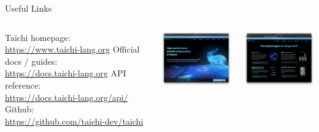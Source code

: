 \begin{frame}{Useful Links}
\begin{columns}
\centering
\begin{outline}
  \1 Taichi homepage: \\ \url{https://www.taichi-lang.org}
  \1 Official docs / guides: \\ \url{https://docs.taichi-lang.org}
  \1 API reference: \\ \url{https://docs.taichi-lang.org/api/}
  \1 Github: \\ \url{https://github.com/taichi-dev/taichi}
\end{outline}
\centering

\includegraphics[width=4.0cm]{taichi_lang_org.png} 

\includegraphics[width=4.0cm]{taichi_lang_org_advantages.png} 

\end{columns}
\end{frame}
